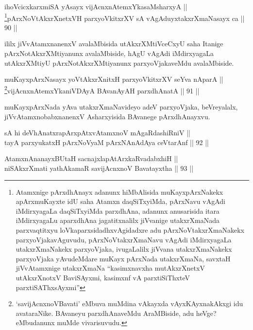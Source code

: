 \begin{shl}
ihoVcicxkarxmiSA yA\s sayx vijAcnxnAtemxYkasaMsharxyA || \\
\footnote{Atamxnige pArxdhAnayx adanunx hiMbAlisida muKayxpArxNakekx
apArxmuKayxte idU saha Atamxn daqSiTxyiMda, pArxNavu vAgAdi
iMdirxyagaLa daqSiTxyiMda parxdhAna, adanunx anusarisida itara
iMdirxyagaLu aparxdhAna jagatitxnalilx jiVvanige utakxrXmaNada
parxvaqtitxyu loVkaparxsidadhxvAgidadxre adu pArxNoVtakxrXmaNakekx
parxyoVjakavAguvudu, pArxNoVtakxrXmaNavu vAgAdi iMdirxyagaLa
utakxrXmaNakekx parxyoVjaka, ivugaLalilx jiVvana utakxrXmaNakekx
parxyoVjaka yAvudeMdare muKayx pArxNada utakxrXmaNa, savxtaH
jiVvAtamxnige utakxrXmaNa ``kasimxnavxha mutAkxrXnetxV utAkxrXnotxV BaviSAyxmi, kasimxnf vA parxtiSiThxteV parxtiSAThxsAyxmi''}pArxNoVtAkxrXnetxVH parxyoVkitxrXV sA vAgAduyxtakxrXmaNasayx ca \hfill || 90 ||  
\end{shl}


\begin{artha}
ililx jiVvAtamxnanenxV avalaMbisida utAkxrXMtiVceCxyU saha Itanige
pArxNotAkxrXMtiyanunx avalaMbiside, hAgU vAgAdi iMdirxyagaLa
utAkxrXMtiyU pArxNotAkxrXMtiyanunx parxyoVjakaveMdu avalaMbiside.
\end{artha}

\begin{shl}
muKayxpArxNasayx yoVtAkxrXnitxH parxyoVkitxrXV seYva nAparA || \\
\footnote{`savijAcnxnoVBavati' eMbuva muMdina vAkayxda
vAyxKAyxnakAkxgi idu avataraNike. BAvaneyu parxdhAnaveMdu
AraMBiside, adu heVge? eMbudanunx muMde vivarisuvudu.}vijAcnxnAtemxYkaniVDAyA BAvanAyAH parxdhAnatA \hfill || 91 ||  
\end{shl}


\begin{artha}
muKayxpArxNada yAva utakxrXmaNavideyo adeV parxyoVjaka, beVreyalalx,
jiVvAtamxnobabxnanenxV Asharxyisida BAvanege pArxdhAnayxvu.
\end{artha}


\begin{shl}
sA hi deVhAnatxrapArxpAtxvAtamxnoV mAgaRdashiRniV || \\
tayA parxyukatxH pArxNoV\s yaM pArxNAnAdAya ceVtarAnf \hfill || 92 ||  
\end{shl}

\begin{shl}
AtamxnA\s nanayxBUtaH sacnajxlapAtArxkaRvadabxhiH || \\
niSAkxrXmati yathAkamaR savijAcnxnoV Bavatayxtha \hfill || 93 ||  
\end{shl}

